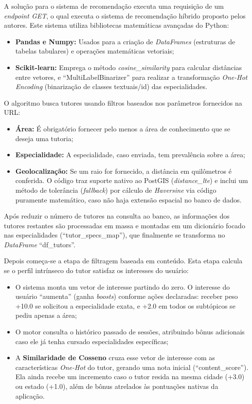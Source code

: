 A solução para o sistema de recomendação executa uma requisição de um \textit{endpoint GET}, o qual executa o sistema de recomendação híbrido proposto pelos autores. Este sistema utiliza bibliotecas matemáticas avançadas do Python:

\begin{itemize}
    \item \textbf{Pandas e Numpy:} Usados para a criação de \textit{DataFrames} (estruturas de tabelas tabulares) e operações matemáticas vetoriais;
    \item \textbf{Scikit-learn:} Emprega o método \textit{cosine\_similarity} para calcular distâncias entre vetores, e ``MultiLabelBinarizer'' para realizar a transformação \textit{One-Hot Encoding} (binarização de classes textuais/id) das especialidades.
\end{itemize}

O algoritmo busca tutores usando filtros baseados nos parâmetros fornecidos na URL:

\begin{itemize}
    \item \textbf{Área:} É obrigatório fornecer pelo menos a área de conhecimento que se deseja uma tutoria;
    \item \textbf{Especialidade:} A especialidade, caso enviada, tem prevalência sobre a área;
    \item \textbf{Geolocalização:} Se um raio for fornecido, a distância em quilômetros é conferida. O código traz suporte nativo ao PostGIS (\textit{distance\_lte}) e inclui um método de tolerância (\textit{fallback}) por cálculo de \textit{Haversine} via código puramente matemático, caso não haja extensão espacial no banco de dados.
\end{itemize}

Após reduzir o número de tutores na consulta ao banco, as informações dos tutores restantes são processadas em massa e montadas em um dicionário focado nas especialidades (``tutor\_specs\_map''), que finalmente se transforma no \textit{DataFrame} ``df\_tutors''.

Depois começa-se a etapa de filtragem baseada em conteúdo. Esta etapa calcula se o perfil intrínseco do tutor satisfaz os interesses do usuário:

\begin{itemize}
    \item O sistema monta um vetor de interesse partindo do zero. O interesse do usuário ``aumenta'' (ganha \textit{boosts}) conforme ações declaradas: receber peso +10.0 se solicitou a especialidade exata, e +2.0 em todos os subtópicos se pediu apenas a área;
    \item O motor consulta o histórico passado de sessões, atribuindo bônus adicionais caso ele já tenha cursado especialidades específicas;
    \item A \textbf{Similaridade de Cosseno} cruza esse vetor de interesse com as características \textit{One-Hot} do tutor, gerando uma nota inicial (``content\_score''). Ela ainda recebe um incremento caso o tutor resida na mesma cidade (+3.0) ou estado (+1.0), além de bônus atrelados às pontuações nativas da aplicação.
\end{itemize}

